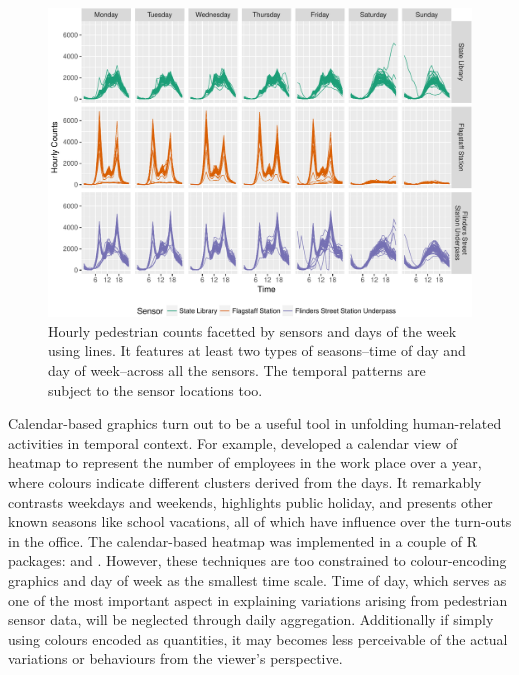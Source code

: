 \documentclass[article]{jss}
\begin{document}
\begin{CodeChunk}
\begin{figure}

{\centering \includegraphics[width=\textwidth]{figure/facet-time-1} 

}

\caption[Hourly pedestrian counts facetted by sensors and days of the week using lines]{Hourly pedestrian counts facetted by sensors and days of the week using lines. It features at least two types of seasons--time of day and day of week--across all the sensors. The temporal patterns are subject to the sensor locations too.}\label{fig:facet-time}
\end{figure}
\end{CodeChunk}

Calendar-based graphics turn out to be a useful tool in unfolding
human-related activities in temporal context. For example,
\citet{VanWijkCluster1999} developed a calendar view of heatmap to
represent the number of employees in the work place over a year, where
colours indicate different clusters derived from the days. It remarkably
contrasts weekdays and weekends, highlights public holiday, and presents
other known seasons like school vacations, all of which have influence
over the turn-outs in the office. The calendar-based heatmap was
implemented in a couple of R packages: 
\citep{R-ggTimeSeries} and  \citep{R-ggcal}. However, these
techniques are too constrained to colour-encoding graphics and day of
week as the smallest time scale. Time of day, which serves as one of the
most important aspect in explaining variations arising from pedestrian
sensor data, will be neglected through daily aggregation. Additionally
if simply using colours encoded as quantities, it may becomes less
perceivable of the actual variations or behaviours from the viewer's
perspective.
\end{document}
